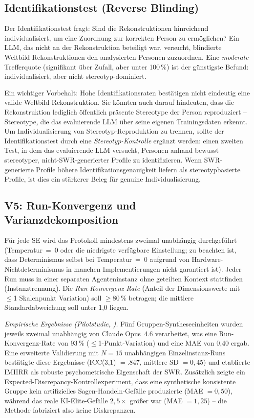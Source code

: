 \documentclass[11pt,a4paper]{article}
\theoremstyle{definition}
\theoremstyle{plain}
\theoremstyle{remark}
\begin{document}
\subsection{Identifikationstest (Reverse Blinding)}
\label{sec:identifikation}

Der Identifikationstest fragt: Sind die Rekonstruktionen hinreichend individualisiert, um eine Zuordnung zur korrekten Person zu erm\"oglichen? Ein LLM, das nicht an der Rekonstruktion beteiligt war, versucht, blindierte Weltbild-Rekonstruktionen den analysierten Personen zuzuordnen. Eine \emph{moderate} Trefferquote (signifikant \"uber Zufall, aber unter 100\,\%) ist der g\"unstigste Befund: individualisiert, aber nicht stereotyp-dominiert.

Ein wichtiger Vorbehalt: Hohe Identifikationsraten best\"atigen nicht eindeutig eine valide Weltbild-Rekonstruktion. Sie k\"onnten auch darauf hindeuten, dass die Rekonstruktion lediglich \"offentlich pr\"asente Stereotype der Person reproduziert -- Stereotype, die das evaluierende LLM \"uber seine eigenen Trainingsdaten erkennt. Um Individualisierung von Stereotyp-Reproduktion zu trennen, sollte der Identifikationstest durch eine \emph{Stereotyp-Kontrolle} erg\"anzt werden: einen zweiten Test, in dem das evaluierende LLM versucht, Personen anhand bewusst stereotyper, nicht-SWR-generierter Profile zu identifizieren. Wenn SWR-generierte Profile h\"ohere Identifikationsgenauigkeit liefern als stereotypbasierte Profile, ist dies ein st\"arkerer Beleg f\"ur genuine Individualisierung.

\subsection{V5: Run-Konvergenz und Varianzdekomposition}
\label{sec:konvergenz}

F\"ur jede SE wird das Protokoll mindestens zweimal unabh\"angig durchgef\"uhrt (Temperatur~=~0 oder die niedrigste verf\"ugbare Einstellung; zu beachten ist, dass Determinismus selbst bei Temperatur~=~0 aufgrund von Hardware-Nichtdeterminismus in manchen Implementierungen nicht garantiert ist). Jeder Run muss in einer separaten Agenteninstanz ohne geteilten Kontext stattfinden (Instanztrennung). Die \emph{Run-Konvergenz-Rate} (Anteil der Dimensionswerte mit $\leq$1 Skalenpunkt Variation) soll $\geq$80\,\% betragen; die mittlere Standardabweichung soll unter 1{,}0 liegen.

\emph{Empirische Ergebnisse (Pilotstudie, \citealp{Geiger2026Elite}).} F\"unf Gruppen-Syntheseeinheiten wurden jeweils zweimal unabh\"angig von Claude Opus~4.6 verarbeitet, was eine Run-Konvergenz-Rate von 93\,\% ($\leq$1-Punkt-Variation) und eine MAE von 0{,}40 ergab. Eine erweiterte Validierung mit $N = 15$ unabh\"angigen Einzelinstanz-Runs best\"atigte diese Ergebnisse (ICC(3,1) $= .847$, mittlere SD $= 0{,}45$) und etablierte IMIIRR als robuste psychometrische Eigenschaft der SWR. Zus\"atzlich zeigte ein Expected-Discrepancy-Kontrollexperiment, dass eine synthetische konsistente Gruppe kein artifizielles Sagen-Handeln-Gef\"alle produzierte (MAE $= 0{,}50$), w\"ahrend das reale KI-Elite-Gef\"alle $2{,}5\times$ gr\"o\ss{}er war (MAE $= 1{,}25$) -- die Methode fabriziert also keine Diskrepanzen.
\end{document}
